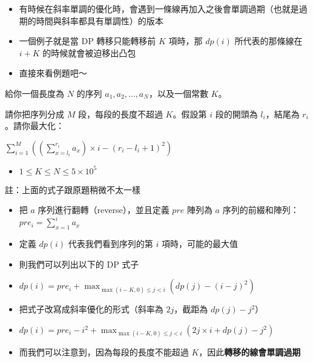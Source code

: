 \documentclass[standalone]{beamer}
\begin{document}
\begin{frame}{}
  \begin{itemize}
    \item 有時候在斜率單調的優化時，會遇到一條線再加入之後會單調過期（也就是過期的時間與斜率都具有單調性）的版本
    \item 一個例子就是當 DP 轉移只能轉移前 $K$ 項時，那 $dp(i)$ 所代表的那條線在 $i + K$ 的時候就會被迫移出凸包
    \item 直接來看例題吧～
  \end{itemize}
\end{frame}

\begin{frame}{}
  \begin{problem}
    給你一個長度為 $N$ 的序列 $a_1, a_2, \dots, a_N$，以及一個常數 $K$。

    請你把序列分成 $M$ 段，每段的長度不超過 $K$。假設第 $i$ 段的開頭為 $l_i$，結尾為 $r_i$。請你最大化：

    $\sum_{i = 1}^{M}((\sum_{x = l_i}^{r_i}a_x) \times i - (r_i - l_i + 1)^2)$

    \begin{itemize}
      \item $1 \leq K \leq N \leq 5 \times 10^5$
    \end{itemize}

    註：上面的式子跟原題稍微不太一樣
  \end{problem}
\end{frame}

\begin{frame}{}
  \begin{itemize}
    \item 把 $a$ 序列進行翻轉（reverse），並且定義 $pre$ 陣列為 $a$ 序列的前綴和陣列： $pre_i = \sum_{x = 1}^{i} a_x$
    \item 定義 $dp(i)$ 代表我們看到序列的第 $i$ 項時，可能的最大值
    \item 則我們可以列出以下的 DP 式子
    \item $dp(i) = pre_i + \max_{\max(i - K, 0) \leq j < i}(dp(j) - (i - j)^2)$
    \item 把式子改寫成斜率優化的形式（斜率為 $2j$，截距為 $dp(j) - j^2$）
    \item $dp(i) = pre_i - i^2 + \max_{\max(i - K, 0) \leq j < i}(2j \times i + dp(j) - j^2)$
    \item 而我們可以注意到，因為每段的長度不能超過 $K$，因此\textbf{轉移的線會單調過期}
  \end{itemize}
\end{frame}
\end{document}

